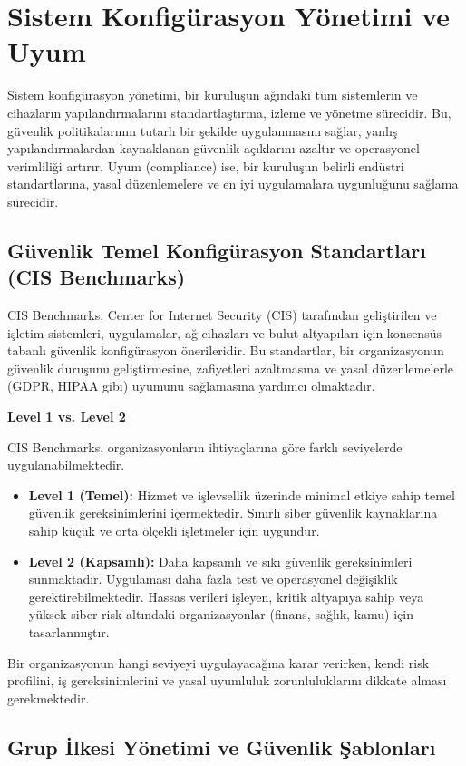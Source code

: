 \section{Sistem Konfigürasyon Yönetimi ve Uyum}

Sistem konfigürasyon yönetimi, bir kuruluşun ağındaki tüm sistemlerin ve cihazların yapılandırmalarını standartlaştırma, izleme ve yönetme sürecidir. Bu, güvenlik politikalarının tutarlı bir şekilde uygulanmasını sağlar, yanlış yapılandırmalardan kaynaklanan güvenlik açıklarını azaltır ve operasyonel verimliliği artırır. Uyum (compliance) ise, bir kuruluşun belirli endüstri standartlarına, yasal düzenlemelere ve en iyi uygulamalara uygunluğunu sağlama sürecidir.

\subsection{Güvenlik Temel Konfigürasyon Standartları (CIS Benchmarks)}
CIS Benchmarks, Center for Internet Security (CIS) tarafından geliştirilen ve işletim sistemleri, uygulamalar, ağ cihazları ve bulut altyapıları için konsensüs tabanlı güvenlik konfigürasyon önerileridir. Bu standartlar, bir organizasyonun güvenlik duruşunu geliştirmesine, zafiyetleri azaltmasına ve yasal düzenlemelerle (GDPR, HIPAA gibi) uyumunu sağlamasına yardımcı olmaktadır.

\textbf{Level 1 vs. Level 2}

CIS Benchmarks, organizasyonların ihtiyaçlarına göre farklı seviyelerde uygulanabilmektedir.

\begin{itemize}
    \item \textbf{Level 1 (Temel):} Hizmet ve işlevsellik üzerinde minimal etkiye sahip temel güvenlik gereksinimlerini içermektedir. Sınırlı siber güvenlik kaynaklarına sahip küçük ve orta ölçekli işletmeler için uygundur.
    \item \textbf{Level 2 (Kapsamlı):} Daha kapsamlı ve sıkı güvenlik gereksinimleri sunmaktadır. Uygulaması daha fazla test ve operasyonel değişiklik gerektirebilmektedir. Hassas verileri işleyen, kritik altyapıya sahip veya yüksek siber risk altındaki organizasyonlar (finans, sağlık, kamu) için tasarlanmıştır.
\end{itemize}

Bir organizasyonun hangi seviyeyi uygulayacağına karar verirken, kendi risk profilini, iş gereksinimlerini ve yasal uyumluluk zorunluluklarını dikkate alması gerekmektedir.

\subsection{Grup İlkesi Yönetimi ve Güvenlik Şablonları}

